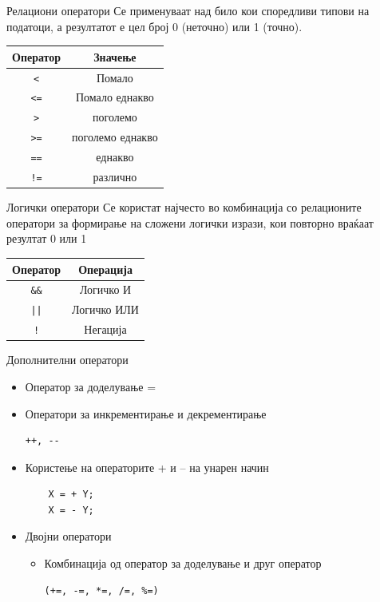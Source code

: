 \begin{frame}{Релациони оператори}
Се применуваат над било кои споредливи типови на податоци, а резултатот е цел број 0 (неточно) или 1 (точно).
\begin{center}
\begin{tabular}{c|c}
\textbf{Оператор} & \textbf{Значење}\\
\hline
\texttt{<} & Помало \\
\texttt{<=} & Помало еднакво \\
\texttt{>} & поголемо \\
\texttt{>=} & поголемо еднакво \\
\texttt{==} & еднакво \\
\texttt{!=} & различно
\end{tabular}
\end{center}
\end{frame}

\begin{frame}{Логички оператори}
Се користат најчесто во комбинација со релационите оператори за формирање на сложени логички изрази, кои повторно враќаат резултат 0 или 1
\linebreak
\begin{center}
\begin{tabular}{c|c}
\textbf{Оператор} & \textbf{Операција}\\
\hline
\texttt{\&\&} & Логичко И \\
\texttt{||} & Логичко ИЛИ \\
\texttt{!} & Негација
\end{tabular}
\end{center}
\end{frame}

\begin{frame}[fragile]{Дополнителни оператори}
\begin{itemize}
\item Оператор за доделување =
\item Оператори за инкрементирање и декрементирање 
\begin{verbatim}
++, --
\end{verbatim}
\item Користење на операторите + и – на унарен начин
  \begin{verbatim}
	X = + Y;
	X = - Y;
  \end{verbatim}
\item Двојни оператори
\begin{itemize}
\item Комбинација од оператор за доделување и друг оператор 
\begin{verbatim}
(+=, -=, *=, /=, %=)
\end{verbatim}
\end{itemize}
\end{itemize}
\end{frame}

